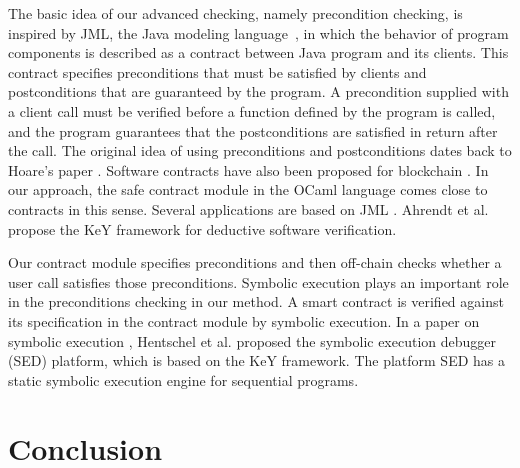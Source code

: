 \documentclass[a4paper,USenglish,american,cleveref, autoref, thm-restate]{oasics-v2021}
\begin{document}

The basic idea of our advanced checking, namely precondition checking,
is inspired by JML, the Java modeling
language~\cite{Leavens2006DesignBC, 101007}, in which the behavior of 
program components is described as a contract between Java
program and its clients. This contract specifies
preconditions that must be satisfied by clients and postconditions
that are guaranteed by the program. A precondition supplied with a
client call must be verified before a function defined by the program
is called, and the program guarantees that the postconditions are
satisfied in return after the call. The original idea of using
preconditions and postconditions dates back to Hoare's paper
\cite{101145}. Software contracts have also been proposed for
blockchain \cite{DBLP:journals/fbloc/Bartoletti20}.
In our approach, the safe contract module in the OCaml language comes
close to contracts in this sense. Several
applications are based on JML \cite{Tran2017}. Ahrendt et
al. \cite{keY} propose the KeY framework for deductive software
verification.  

Our contract module specifies preconditions and then off-chain checks whether a user call satisfies those preconditions. Symbolic execution plays an important role in the preconditions checking in our method. A smart contract is verified against its specification in the contract module by symbolic execution. In a paper on symbolic execution \cite{Hentschel}, Hentschel et al. proposed the symbolic execution debugger (SED) platform, which is based on the KeY framework. The platform SED has a static symbolic execution engine for sequential programs.

\section{Conclusion}
\label{sec:conclusion}
\end{document}

